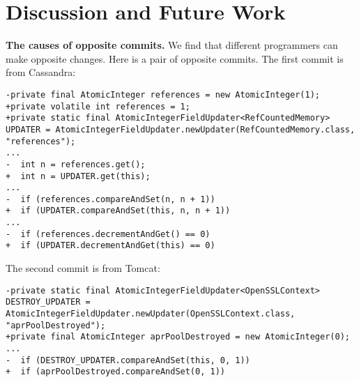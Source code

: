 \section{Discussion and Future Work}
\label{sec:discuss}
%
%
%
%
%
%
%
%

\noindent
\textbf{The causes of opposite commits.} We find that different programmers can make opposite changes. Here is a pair of opposite commits. The first commit is from Cassandra:

\begin{lstlisting}
-private final AtomicInteger references = new AtomicInteger(1);
+private volatile int references = 1;
+private static final AtomicIntegerFieldUpdater<RefCountedMemory> UPDATER = AtomicIntegerFieldUpdater.newUpdater(RefCountedMemory.class, "references");
...
-  int n = references.get();
+  int n = UPDATER.get(this);
...
-  if (references.compareAndSet(n, n + 1))
+  if (UPDATER.compareAndSet(this, n, n + 1))
...
-  if (references.decrementAndGet() == 0)
+  if (UPDATER.decrementAndGet(this) == 0)
\end{lstlisting}

The second commit is from Tomcat:

\begin{lstlisting}
-private static final AtomicIntegerFieldUpdater<OpenSSLContext> DESTROY_UPDATER = AtomicIntegerFieldUpdater.newUpdater(OpenSSLContext.class, "aprPoolDestroyed");
+private final AtomicInteger aprPoolDestroyed = new AtomicInteger(0);
...
-  if (DESTROY_UPDATER.compareAndSet(this, 0, 1))
+  if (aprPoolDestroyed.compareAndSet(0, 1))
\end{lstlisting}

